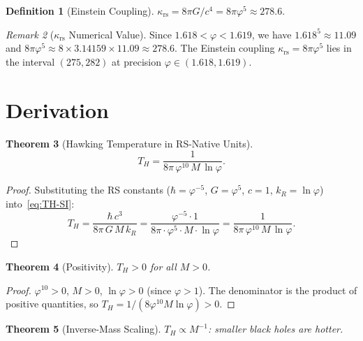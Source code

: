 \documentclass[12pt,a4paper]{article}
\newtheorem{theorem}{Theorem}[section]
\theoremstyle{definition}
\newtheorem{definition}[theorem]{Definition}
\theoremstyle{remark}
\newtheorem{remark}[theorem]{Remark}
\begin{document}
\begin{definition}[Einstein Coupling]
$\kappa_{\mathrm{rs}} = 8\pi G/c^4 = 8\pi\varphi^5 \approx 278.6$.
\end{definition}

\begin{remark}[$\kappa_{\mathrm{rs}}$ Numerical Value]
Since $1.618 < \varphi < 1.619$, we have $1.618^5 \approx 11.09$
and $8\pi\varphi^5 \approx 8 \times 3.14159 \times 11.09 \approx 278.6$.
The Einstein coupling $\kappa_{\mathrm{rs}} = 8\pi\varphi^5$ lies
in the interval $(275, 282)$ at precision $\varphi \in (1.618, 1.619)$.
\end{remark}

\section{Derivation}
\label{sec:derivation}

\begin{theorem}[Hawking Temperature in RS-Native Units]
\label{thm:TH}
\begin{equation}
  T_H = \frac{1}{8\pi\,\varphi^{10}\,M\,\ln\varphi}.
\end{equation}
\end{theorem}

\begin{proof}
Substituting the RS constants ($\hbar = \varphi^{-5}$, $G = \varphi^5$,
$c = 1$, $k_R = \ln\varphi$) into~\eqref{eq:TH-SI}:
\begin{equation}
  T_H = \frac{\hbar\,c^3}{8\pi\,G\,M\,k_R}
  = \frac{\varphi^{-5} \cdot 1}{8\pi \cdot \varphi^5 \cdot M
  \cdot \ln\varphi}
  = \frac{1}{8\pi\,\varphi^{10}\,M\,\ln\varphi}.
\end{equation}
\end{proof}

\begin{theorem}[Positivity]
\label{thm:positive}
$T_H > 0$ for all $M > 0$.
\end{theorem}

\begin{proof}
$\varphi^{10} > 0$, $M > 0$, $\ln\varphi > 0$ (since $\varphi > 1$).
The denominator is the product of positive quantities, so
$T_H = 1/(8\varphi^{10} M \ln\varphi) > 0$.
\end{proof}

\begin{theorem}[Inverse-Mass Scaling]
$T_H \propto M^{-1}$: smaller black holes are hotter.
\end{theorem}
\end{document}
